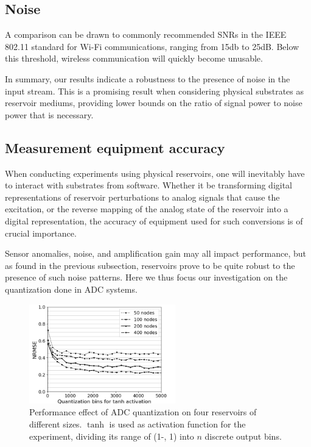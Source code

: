 \subsection{Noise}



A comparison can be drawn to commonly recommended SNRs in the IEEE 802.11
standard for Wi-Fi communications, ranging from 15db to 25dB. Below this
threshold, wireless communication will quickly become unusable.

In summary, our results indicate a robustness to the presence of noise in the
input stream. This is a promising result when considering physical substrates as
reservoir mediums, providing lower bounds on the ratio of signal power to noise
power that is necessary.

\subsection{Measurement equipment accuracy}

When conducting experiments using physical reservoirs, one will inevitably have
to interact with substrates from software. Whether it be transforming digital
representations of reservoir perturbations to analog signals that cause the
excitation, or the reverse mapping of the analog state of the reservoir into a
digital representation, the accuracy of equipment used for such conversions is
of crucial importance.

Sensor anomalies, noise, and amplification gain may all impact performance, but
as found in the previous subsection, reservoirs prove to be quite robust to the
presence of such noise patterns. Here we thus focus our investigation on the
quantization done in ADC systems.


\begin{figure}[H]
  \centering
  \includegraphics[width=2.5in]{img/adc_quantization.png}
  \caption{
    Performance effect of ADC quantization on four reservoirs of different
sizes. $\tanh$ is used as activation function for the experiment, dividing its
range of (1-, 1) into $n$ discrete output bins.
  }
  \label{adc_quantization}
\end{figure}

